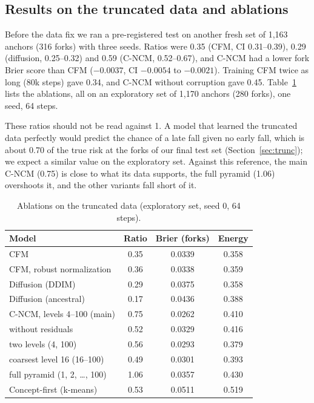 \documentclass[conference]{IEEEtran}
\newcommand{\cncm}{C-NCM}
\begin{document}
\subsection{Results on the truncated data and ablations}
\label{app:v2}
Before the data fix we ran a pre-registered test on another fresh set of 1,163 anchors
(316 forks) with three seeds. Ratios were 0.35 (CFM, CI 0.31--0.39), 0.29 (diffusion,
0.25--0.32) and 0.59 (\cncm{}, 0.52--0.67), and \cncm{} had a lower fork Brier score than
CFM ($-0.0037$, CI $-0.0054$ to $-0.0021$). Training CFM twice as long (80k steps) gave
0.34, and \cncm{} without corruption gave 0.45. Table~\ref{tab:ablate} lists the ablations,
all on an exploratory set of 1,170 anchors (280 forks), one seed, 64 steps.

These ratios should not be read against 1. A model that learned the truncated data
perfectly would predict the chance of a late fall given no early fall, which is about 0.70
of the true risk at the forks of our final test set (Section~\ref{sec:trunc}); we expect a
similar value on the exploratory set. Against this reference, the main \cncm{} (0.75) is
close to what its data supports, the full pyramid (1.06) overshoots it, and the other
variants fall short of it.

\begin{table}[h]
  \centering
  \caption{Ablations on the truncated data (exploratory set, seed 0, 64 steps).}
  \label{tab:ablate}
  \footnotesize
  \setlength{\tabcolsep}{4pt}
  \begin{tabular}{lccc}
    \toprule
    Model & Ratio & Brier (forks) & Energy \\
    \midrule
    CFM & 0.35 & 0.0339 & 0.358 \\
    CFM, robust normalization & 0.36 & 0.0338 & 0.359 \\
    Diffusion (DDIM) & 0.29 & 0.0375 & 0.358 \\
    Diffusion (ancestral) & 0.17 & 0.0436 & 0.388 \\
    \cncm{}, levels 4--100 (main) & 0.75 & 0.0262 & 0.410 \\
    \quad without residuals & 0.52 & 0.0329 & 0.416 \\
    \quad two levels (4, 100) & 0.56 & 0.0293 & 0.379 \\
    \quad coarsest level 16 (16--100) & 0.49 & 0.0301 & 0.393 \\
    \quad full pyramid (1, 2, \dots, 100) & 1.06 & 0.0357 & 0.430 \\
    Concept-first (k-means) & 0.53 & 0.0511 & 0.519 \\
    \bottomrule
  \end{tabular}
\end{table}
\end{document}
